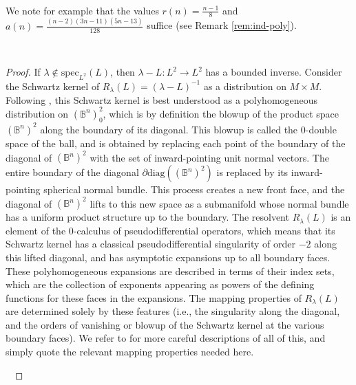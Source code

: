 \documentclass[10pt,reqno]{amsart}
\newcommand{\del}{\partial}
\begin{document}
\

We note for example that the values $r(n) = \frac{n-1}{8}$ and $a(n)=\frac{(n-2)(3n-11)(5n-13)}{128}$ suffice (see Remark \ref{rem:ind-poly}).


\

\begin{proof}
If $\lambda \not\in \mathrm{spec}_{L^2} (L)$, then $\lambda - L: L^2 \to L^2$ has a bounded inverse.  Consider the Schwartz kernel of $R_{\lambda}(L) = 
(\lambda - L)^{-1}$ as a distribution on $M \times M$.  Following \cite{Ma-edge}, this Schwartz kernel is best understood as a polyhomogeneous distribution on $(\mathbb{B}^n)^2_0$, which is by definition the blowup 
of the product space $(\mathbb{B}^n)^2$ along the boundary of its diagonal. This blowup is called the $0$-double space of the ball, and is obtained by replacing each
point of the boundary of the diagonal of $(\mathbb{B}^n)^2$ with the set of inward-pointing unit normal vectors.  The entire boundary of the diagonal $\del \mathrm{diag}((\mathbb{B}^n)^2)$
is replaced by its inward-pointing spherical normal bundle.  This process creates a new front face, and the diagonal of $(\mathbb{B}^n)^2$
lifts to this new space as a submanifold whose normal bundle has a uniform product structure up to the boundary.  The resolvent $R_\lambda(L)$
is an element of the $0$-calculus of pseudodifferential operators, which means that its Schwartz kernel has a classical pseudodifferential singularity of order $-2$ along
this lifted diagonal, and has asymptotic expansions up to all boundary faces. These polyhomogeneous expansions are described in terms
of their index sets, which are the collection of exponents appearing as powers of the defining functions for these faces in the expansions. 
The mapping properties of $R_\lambda(L)$ are determined solely by these features (i.e., the singularity along the diagonal, and the orders
of vanishing or blowup of the Schwartz kernel at the various boundary faces). We refer to \cite{Ma-edge} for more careful descriptions of
all of this, and simply quote the relevant mapping properties needed here. 

\


\end{proof}
\end{document}
